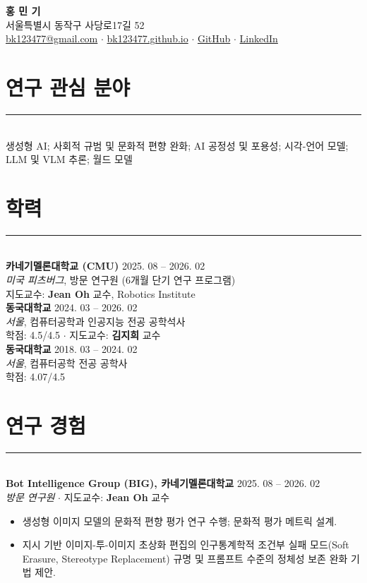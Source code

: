 \documentclass[10pt,a4paper]{article}
\newcommand{\sectionrule}{\vspace{-0.5em}\rule{\textwidth}{0.4pt}\\[0.2em]}
\newcommand{\cvheader}[1]{{\normalsize\bfseries #1}}
\newcommand{\cvposition}[1]{{\itshape #1}}
\newcommand{\cvlocation}[1]{{\itshape #1}}
\newcommand{\cvdate}[1]{\hfill #1}
\begin{document}
\begin{center}
    {\Large\bfseries 홍 민 기}\\[4pt]
    \small
    서울특별시 동작구 사당로17길 52\\
    \href{mailto:bk123477@gmail.com}{bk123477@gmail.com} \quad $\cdot$ \quad
    \href{https://bk123477.github.io/}{bk123477.github.io} \quad $\cdot$ \quad
    \href{https://github.com/bk123477}{GitHub} \quad $\cdot$ \quad
    \href{https://www.linkedin.com/in/bk123477}{LinkedIn}
\end{center}

\section{연구 관심 분야}
\sectionrule
생성형 AI; 사회적 규범 및 문화적 편향 완화; AI 공정성 및 포용성; 시각-언어 모델; LLM 및 VLM 추론; 월드 모델

\section{학력}
\sectionrule
\cvheader{카네기멜론대학교 (CMU)} \cvdate{2025. 08 -- 2026. 02}\\
\cvlocation{미국 피츠버그},
방문 연구원 (6개월 단기 연구 프로그램)\\
지도교수: \textbf{Jean Oh} 교수, Robotics Institute\\[2pt]

\cvheader{동국대학교} \cvdate{2024. 03 -- 2026. 02}\\
\cvlocation{서울},
컴퓨터공학과 인공지능 전공 공학석사\\
학점: 4.5/4.5 $\cdot$ 지도교수: \textbf{김지희} 교수\\[2pt]

\cvheader{동국대학교} \cvdate{2018. 03 -- 2024. 02}\\
\cvlocation{서울},
컴퓨터공학 전공 공학사\\
학점: 4.07/4.5

\section{연구 경험}
\sectionrule
\cvheader{Bot Intelligence Group (BIG), 카네기멜론대학교} \cvdate{2025. 08 -- 2026. 02}\\
\cvposition{방문 연구원} $\cdot$ 지도교수: \textbf{Jean Oh} 교수
\begin{itemize}
    \item 생성형 이미지 모델의 문화적 편향 평가 연구 수행; 문화적 평가 메트릭 설계.
    \item 지시 기반 이미지-투-이미지 초상화 편집의 인구통계학적 조건부 실패 모드(Soft Erasure, Stereotype Replacement) 규명 및 프롬프트 수준의 정체성 보존 완화 기법 제안.
\end{itemize}
\end{document}
